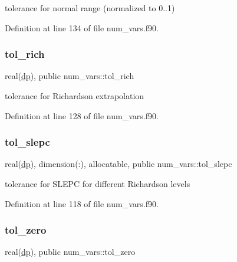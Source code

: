 tolerance for normal range (normalized to 0..1) 



Definition at line 134 of file num\+\_\+vars.\+f90.

\mbox{\label{namespacenum__vars_aa0091a935b9502afef09a87c0f590e9d}} 
\subsubsection{\texorpdfstring{tol\+\_\+rich}{tol\_rich}}
{\footnotesize\ttfamily real(\hyperlink{namespacenum__vars_a03802aa2bd86439d7a9370836fabf3f2}{dp}), public num\+\_\+vars\+::tol\+\_\+rich}



tolerance for Richardson extrapolation 



Definition at line 128 of file num\+\_\+vars.\+f90.

\mbox{\label{namespacenum__vars_acbfccf15a8af9fce37f9cb3f2c85be76}} 
\subsubsection{\texorpdfstring{tol\+\_\+slepc}{tol\_slepc}}
{\footnotesize\ttfamily real(\hyperlink{namespacenum__vars_a03802aa2bd86439d7a9370836fabf3f2}{dp}), dimension(\+:), allocatable, public num\+\_\+vars\+::tol\+\_\+slepc}



tolerance for S\+L\+E\+PC for different Richardson levels 



Definition at line 118 of file num\+\_\+vars.\+f90.

\mbox{\label{namespacenum__vars_ae2387f8182114da91104322ca3250d9a}} 
\subsubsection{\texorpdfstring{tol\+\_\+zero}{tol\_zero}}
{\footnotesize\ttfamily real(\hyperlink{namespacenum__vars_a03802aa2bd86439d7a9370836fabf3f2}{dp}), public num\+\_\+vars\+::tol\+\_\+zero}



